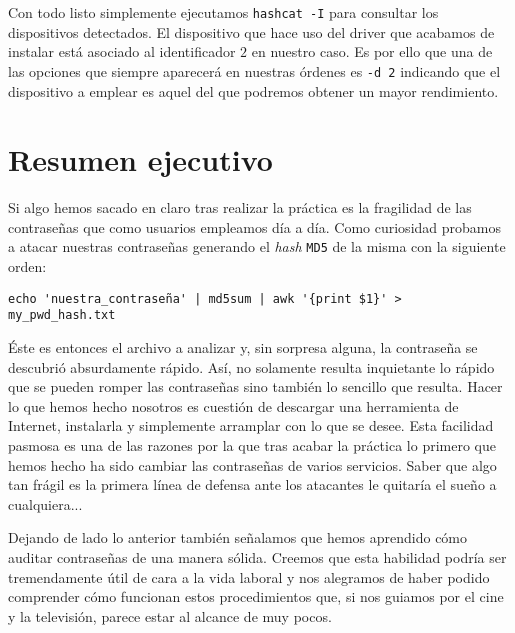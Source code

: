 \documentclass{article}
\begin{document}

        Con todo listo simplemente ejecutamos \texttt{hashcat -I} para consultar los dispositivos detectados. El dispositivo que hace uso del driver que acabamos de instalar está asociado al identificador $2$ en nuestro caso. Es por ello que una de las opciones que siempre aparecerá en nuestras órdenes es \texttt{-d 2} indicando que el dispositivo a emplear es aquel del que podremos obtener un mayor rendimiento.

    \section{Resumen ejecutivo}
        Si algo hemos sacado en claro tras realizar la práctica es la fragilidad de las contraseñas que como usuarios empleamos día a día. Como curiosidad probamos a atacar nuestras contraseñas generando el \textit{hash} \texttt{MD5} de la misma con la siguiente orden:

        \begin{verbatim}
echo 'nuestra_contraseña' | md5sum | awk '{print $1}' > my_pwd_hash.txt
        \end{verbatim}

        Éste es entonces el archivo a analizar y, sin sorpresa alguna, la contraseña se descubrió absurdamente rápido. Así, no solamente resulta inquietante lo rápido que se pueden romper las contraseñas sino también lo sencillo que resulta. Hacer lo que hemos hecho nosotros es cuestión de descargar una herramienta de Internet, instalarla y simplemente arramplar con lo que se desee. Esta facilidad pasmosa es una de las razones por la que tras acabar la práctica lo primero que hemos hecho ha sido cambiar las contraseñas de varios servicios. Saber que algo tan frágil es la primera línea de defensa ante los atacantes le quitaría el sueño a cualquiera...

        Dejando de lado lo anterior también señalamos que hemos aprendido cómo auditar contraseñas de una manera sólida. Creemos que esta habilidad podría ser tremendamente útil de cara a la vida laboral y nos alegramos de haber podido comprender cómo funcionan estos procedimientos que, si nos guiamos por el cine y la televisión, parece estar al alcance de muy pocos.
\end{document}
